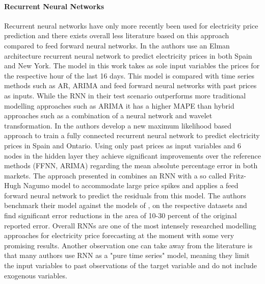 \paragraph{Recurrent Neural Networks}
Recurrent neural networks have only more recently been used for electricity price prediction and there exists overall less literature based on this approach compared to feed forward neural networks. In \cite{anbazhagan_day-ahead_2013} the authors use an Elman architecture recurrent neural network to predict electricity prices in both Spain and New York. The model in this work takes as sole input variables the prices for the respective hour of the last 16 days. This model is compared with time series methods such as AR, ARIMA and feed forward neural networks with past prices as inputs. While the RNN in their test scenario outperforms more traditional modelling approaches such as ARIMA it has a higher MAPE than hybrid approaches such as a combination of a neural network and wavelet transformation. In  \cite{mirikitani_nonlinear_2011} the authors develop a new maximum likelihood based approach to train a fully connected recurrent neural network to predict electricity prices in Spain and Ontario. Using only past prices as input variables and 6 nodes in the hidden layer they achieve significant improvements over the reference methods (FFNN, ARIMA) regarding the mean absolute percentage error in both markets. The approach presented in  \cite{sharma_hybrid_2013} combines an RNN with a so called Fritz-Hugh Nagumo model to accommodate large price spikes and applies a feed forward neural network to predict the residuals from this model. The authors benchmark their model against the models of \cite{mirikitani_nonlinear_2011}, \cite{zareipour_application_2006} on the respective datasets and find significant error reductions in the area of 10-30 percent of the original reported error. Overall RNNs are one of the most intensely researched modelling approaches for electricity price forecasting at the moment with some very promising results. Another observation one can take away from the literature is that many authors use RNN as a "pure time series" model, meaning they limit the input variables to past observations of the target variable and do not include exogenous variables.





